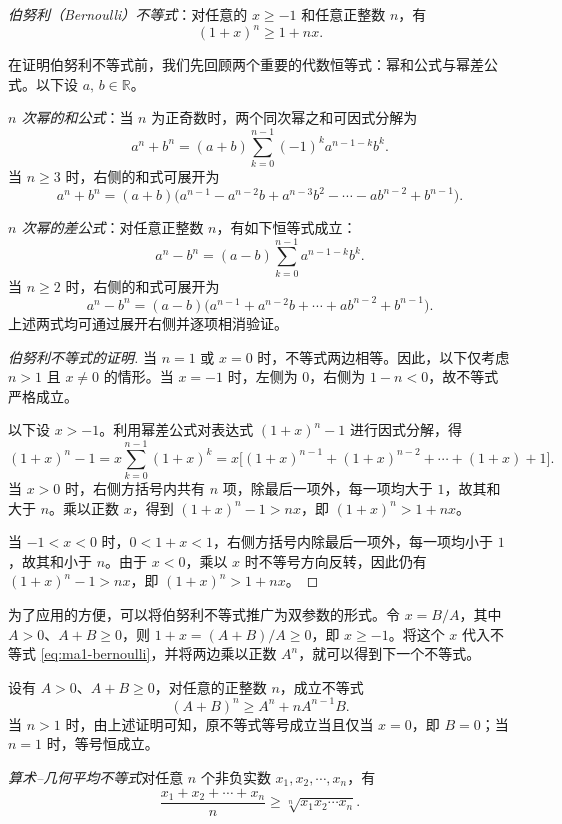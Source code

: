 \documentclass[UTF8,12pt,a4paper,fontset=fandol]{ctexbook}
\begin{document}
\emph{伯努利（Bernoulli）不等式}：对任意的 $x\geqslant -1$ 和任意正整数 $n$，有
\begin{equation}
  \label{eq:ma1-bernoulli}
  (1+x)^n\geqslant 1+nx.
\end{equation}


在证明伯努利不等式前，我们先回顾两个重要的代数恒等式：幂和公式与幂差公式。以下设 $a,\,b\in\mathbb{R}$。


\emph{$n$ 次幂的和公式}：当 $n$ 为正奇数时，两个同次幂之和可因式分解为
\[
  a^n+b^n=(a+b)\sum_{k=0}^{n-1}(-1)^k a^{n-1-k}b^k.
\]
当 $n\geqslant3$ 时，右侧的和式可展开为
\[
  a^n+b^n=(a+b)\bigl(a^{n-1}-a^{n-2}b+a^{n-3}b^2-\cdots-ab^{n-2}+b^{n-1}\bigr).
\]


\emph{$n$ 次幂的差公式}：对任意正整数 $n$，有如下恒等式成立：
\[
  a^n-b^n=(a-b)\sum_{k=0}^{n-1}a^{n-1-k}b^k.
\]
当 $n\geqslant2$ 时，右侧的和式可展开为
\[
  a^n-b^n=(a-b)\bigl(a^{n-1}+a^{n-2}b+\cdots+ab^{n-2}+b^{n-1}\bigr).
\]
上述两式均可通过展开右侧并逐项相消验证。


\begin{proof}[伯努利不等式的证明]
当 $n=1$ 或 $x=0$ 时，不等式两边相等。因此，以下仅考虑 $n>1$ 且 $x\ne0$ 的情形。当 $x=-1$ 时，左侧为 $0$，右侧为 $1-n<0$，故不等式严格成立。

以下设 $x>-1$。利用幂差公式对表达式 $(1+x)^n-1$ 进行因式分解，得
\[
  (1+x)^n-1
  =x\sum_{k=0}^{n-1}(1+x)^k
  =x\bigl[(1+x)^{n-1}+(1+x)^{n-2}+\cdots+(1+x)+1\bigr].
\]
当 $x>0$ 时，右侧方括号内共有 $n$ 项，除最后一项外，每一项均大于 $1$，故其和大于 $n$。乘以正数 $x$，得到 $(1+x)^n-1>nx$，即 $(1+x)^n>1+nx$。

当 $-1<x<0$ 时，$0<1+x<1$，右侧方括号内除最后一项外，每一项均小于 $1$，故其和小于 $n$。由于 $x<0$，乘以 $x$ 时不等号方向反转，因此仍有 $(1+x)^n-1>nx$，即 $(1+x)^n>1+nx$。
\end{proof}


为了应用的方便，可以将伯努利不等式推广为双参数的形式。令 $x=B/A$，其中 $A>0$、$A+B\geqslant0$，则 $1+x=(A+B)/A\geqslant0$，即 $x\geqslant-1$。将这个 $x$ 代入不等式 \eqref{eq:ma1-bernoulli}，并将两边乘以正数 $A^n$，就可以得到下一个不等式。

设有 $A>0$、$A+B\geqslant0$，对任意的正整数 $n$，成立不等式
\begin{equation}
  \label{eq:ma1-bernoulli-two-parameters}
  (A+B)^n\geqslant A^n+nA^{n-1}B.
\end{equation}
当 $n>1$ 时，由上述证明可知，原不等式等号成立当且仅当 $x=0$，即 $B=0$；当 $n=1$ 时，等号恒成立。

\noindent\emph{算术--几何平均不等式}\quad 对任意 $n$ 个非负实数 $x_1,x_2,\cdots,x_n$，有
\[
  \frac{x_1+x_2+\cdots+x_n}{n}\geqslant \sqrt[n]{x_1x_2\cdots x_n}.
\]
\end{document}
